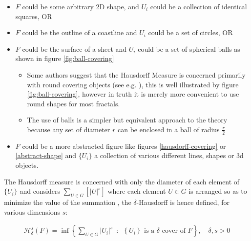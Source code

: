 \documentclass[a4paper,11pt,twoside]{article}
\begin{document}
\begin{itemize}
\item \(F\) could be some arbitrary 2D shape, and \(U_{i}\) could be
a collection of identical squares, OR

\item \(F\) could be the outline of a coastline and \(U_{i}\) could be a set of circles, OR

\item \(F\) could be the surface of a sheet and \(U_{i}\) could be a set of spherical balls as shown in figure \ref{fig:ball-covering}

\begin{itemize}
\item Some authors suggest that the Hausdorff Measure is concerned primarily with round covering objects (see e.g. \cite{sandersonFractalsAreTypically2017}), this is well illustrated by figure \ref{fig:ball-covering}, however in truth it is merely more convenient to use round shapes for most fractals.

\item The use of balls is a simpler but equivalent approach to the theory \cite[ ]{falconerFractalGeometryMathematical2003b} because any set of diameter \(r\) can be enclosed in a ball of radius \(\frac{r}{2}\) \cite[p. 166]{edgarMeasureTopologyFractal2008}
\end{itemize}

\item \(F\) could be a more abstracted figure like figures \ref{hausdorff-covering} or \ref{abstract-shape}  and \(\{U_{i}\}\) a collection of various different lines, shapes or 3d objects.
\end{itemize}

The Hausdorff measure is concerned with only the diameter of each element of \(\{U_{i}\}\) and considers \(\sum_{U \in G} \left[\left\lvert U\right\rvert^{s}\right]\) where each element \(U\in G\) is arranged so as to minimize the value of the summation \cite[p. 27]{falconerFractalGeometryMathematical2003b}
, the \(\delta\)-Hausdorff is hence defined, for various dimensions \(s\):

\begin{align}
\mathcal{H}^s_{\delta}\left( F \right)= \inf \left\{ \sum_{U\in G}   \left\lvert U_i \right\rvert^s \enspace : \enspace  \left\{U_i\right\} \text{ is a } \delta \text{-cover of } F \right\}, \quad \delta, s > 0 \label{eq:delta-measure}
\end{align}
\end{document}
